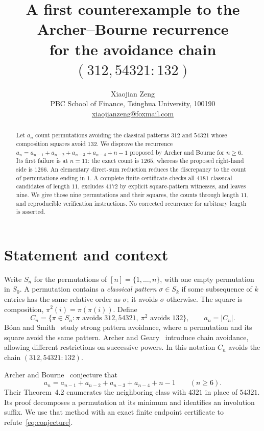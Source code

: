 \documentclass[11pt,a4paper]{article}
\title{A first counterexample to the Archer--Bourne recurrence\\
for the avoidance chain $(312,54321:132)$}
\author{Xiaojian Zeng\\[3pt]
  \small PBC School of Finance, Tsinghua University, 100190\\
  \small\href{mailto:xiaojianzeng@foxmail.com}{xiaojianzeng@foxmail.com}}
\date{}
\begin{document}
\maketitle

\begin{abstract}
Let $a_n$ count permutations avoiding the classical patterns $312$ and
$54321$ whose composition squares avoid $132$. We disprove the recurrence
$a_n=a_{n-1}+a_{n-2}+a_{n-3}+a_{n-4}+n-1$ proposed by Archer and Bourne
for $n\geq6$. Its first failure is at $n=11$: the exact count is $1265$,
whereas the proposed right-hand side is $1266$.
An elementary direct-sum reduction reduces the discrepancy to the count of
permutations ending in $1$. A complete finite certificate checks all $4181$
classical candidates of length $11$, excludes $4172$ by explicit square-pattern
witnesses, and leaves nine. We give those nine permutations and their squares,
the counts through length $11$, and reproducible verification instructions.
No corrected recurrence for arbitrary length is asserted.
\end{abstract}

\section{Statement and context}

Write $S_n$ for the permutations of $[n]=\{1,\ldots,n\}$, with one empty
permutation in $S_0$. A permutation contains a \emph{classical pattern}
$\sigma\in S_k$ if some subsequence of $k$ entries has the same relative
order as $\sigma$; it avoids $\sigma$ otherwise. The square is composition,
$\pi^2(i)=\pi(\pi(i))$. Define
\[
 C_n=\{\pi\in S_n:\pi\text{ avoids }312,54321,
                  \ \pi^2\text{ avoids }132\},\qquad a_n=|C_n|.
\]
B\'ona and Smith~\cite{BonaSmith2019} study strong pattern avoidance,
where a permutation and its square avoid the same pattern. Archer and
Geary~\cite{ArcherGeary2024} introduce chain avoidance, allowing different
restrictions on successive powers. In this notation $C_n$ avoids the chain
$(312,54321:132)$.

Archer and Bourne~\cite[Section~5]{ArcherBourne2026} conjecture that
\begin{equation}\label{eq:conjecture}
 a_n=a_{n-1}+a_{n-2}+a_{n-3}+a_{n-4}+n-1\qquad(n\geq6).
\end{equation}
Their Theorem~4.2 enumerates the neighboring class with $4321$ in place of
$54321$. Its proof decomposes a permutation at its minimum and identifies
an involution suffix. We use that method with an exact finite endpoint
certificate to refute~\eqref{eq:conjecture}.
\end{document}
